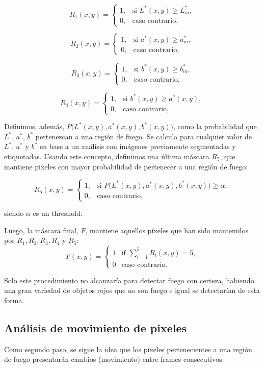 \documentclass[a4paper]{article}
\begin{document}
\[
R_1(x,y) = 
\begin{cases}
    1, & \text{si } L^*(x,y) \geq L^*_m, \\
    0, & \text{caso contrario,}
\end{cases}
\]

\[
R_2(x,y) = 
\begin{cases}
    1, & \text{si } a^*(x,y) \geq a^*_m, \\
    0, & \text{caso contrario,}
\end{cases}
\]

\[
R_3(x,y) = 
\begin{cases}
    1, & \text{si } b^*(x,y) \geq b^*_m, \\
    0, & \text{caso contrario,}
\end{cases}
\]

\[
R_4(x,y) = 
\begin{cases}
    1, & \text{si } b^*(x,y) \geq a^*(x,y), \\
    0, & \text{caso contrario,}
\end{cases}
\]

Definimos, además, $P\big(L^*(x,y), a^*(x,y), b^*(x,y)\big)$, como la probabilidad que $L^*$, $a^*$, $b^*$ pertenezcan a una región de fuego. Se calcula para cualquier valor de $L^*$, $a^*$ y $b^*$ en base a un análisis con imágenes previamente segmentadas y etiquetadas. Usando este concepto, definimos una última máscara $R_5$, que mantiene pixeles con mayor probabilidad de pertenecer a una región de fuego: 

\[
R_5(x,y) = 
\begin{cases}
    1, & \text{si } P\big(L^*(x,y), a^*(x,y), b^*(x,y)\big) \geq \alpha, \\
    0, & \text{caso contrario,}
\end{cases}
\]

siendo $\alpha$ es un threshold.

Luego, la máscara final, $F$, mantiene aquellos píxeles que han sido mantenidos por $R_1, R_2, R_3, R_4$ y $R_5$:
\[
F(x,y) =
\begin{cases}
1 & \text{if } \sum_{i=1}^5 R_i(x,y) = 5, \\
0 & \text{caso contrario}.
\end{cases}
\]

Solo este procedimiento no alcanzaría para detectar fuego con certeza, habiendo una gran variedad de objetos rojos que no son fuego e igual se detectarían de esta forma. 

\subsection{Análisis de movimiento de pixeles}
Como segundo paso, se sigue la idea que los píxeles pertenecientes a una región de fuego presentarán cambios (movimiento) entre frames consecutivos. 
\end{document}

